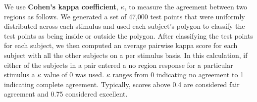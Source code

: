\documentclass[11pt,letterpaper]{article}
\begin{document}
We use \textbf{Cohen's kappa coefficient}, $\kappa$, to measure the agreement between two regions as follows.  We generated a set of 47,000 test points that were uniformly distributed across each stimulus and used each subject's polygon to classify the test points as being inside or outside the polygon. After classifying the test points for each subject, we then computed an average pairwise kappa score for each subject with all the other subjects on a per stimulus basis. In this calculation, if either of the subjects in a pair entered a no region response for a particular stimulus a $\kappa$ value of 0 was used.  $\kappa$ ranges from 0 indicating no agreement to 1 indicating complete agreement.  Typically, scores above 0.4 are considered fair agreement and 0.75 considered excellent.


\renewcommand{\thefootnote}{\fnsymbol{footnote}}
\end{document}

